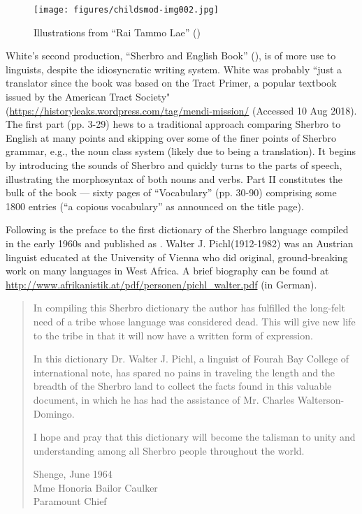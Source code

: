 \begin{figure}
\caption{Illustrations from “Rai Tammo Lae” (\citealt{White1860})}
\label{fig:intro:1}
\texttt{[image: figures/childsmod-img002.jpg]}
\end{figure}

White's second production, “Sherbro and English Book” (\citealt{White1862}), is of more use to linguists, despite the idiosyncratic writing system. White was probably “just a translator since the book was based on the Tract Primer, a popular textbook issued by the American Tract Society" (\url{https://historyleaks.wordpress.com/tag/mendi-mission/} (Accessed 10  {Aug 2018}). The first part (pp. 3-29) hews to a traditional approach comparing Sherbro to English at many points and skipping over some of the finer points of Sherbro grammar, e.g., the noun class system (likely due to being a translation). It begins by introducing the sounds of Sherbro and quickly turns to the parts of speech, illustrating the morphosyntax of both nouns and verbs. Part II constitutes the bulk of the book — sixty pages of “Vocabulary” (pp. 30-90) comprising some 1800 entries (“a copious vocabulary” as announced on the title page).

Following is the preface to the first dictionary of the Sherbro language compiled in the early 1960s and published as \citet{Pichl1967}. Walter J. Pichl(1912-1982) was an Austrian linguist educated at the University of Vienna who did original, ground-breaking work on many languages in West Africa. A brief biography can be found at \url{http://www.afrikanistik.at/pdf/personen/pichl_walter.pdf} (in German).

\begin{quote}
    In compiling this Sherbro dictionary the author has fulfilled the long-felt need of a tribe whose language was considered dead. This will give new life to the tribe in that it will now have a written form of expression.
    
    In this dictionary Dr. Walter J. Pichl, a linguist of Fourah Bay College of international note, has spared no pains in traveling the length and the breadth of the Sherbro land to collect the facts found in this valuable document, in which he has had the assistance of Mr. Charles Walterson-Domingo.
    
    I hope and pray that this dictionary will become the talisman to unity and understanding among all Sherbro people throughout the world.

Shenge, June 1964\\
Mme Honoria Bailor Caulker\\
Paramount Chief
\end{quote}

